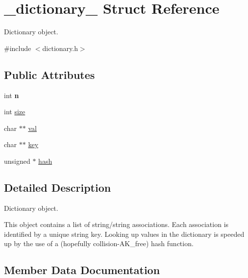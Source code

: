 \hypertarget{struct__dictionary__}{}\section{\+\_\+dictionary\+\_\+ Struct Reference}
\label{struct__dictionary__}


Dictionary object.  




{\ttfamily \#include $<$dictionary.\+h$>$}

\subsection*{Public Attributes}
\begin{DoxyCompactItemize}
\item 
\mbox{\label{struct__dictionary___ac93e659a505b71aa87b8b558b55ee872}} 
int {\bfseries n}
\item 
int \hyperlink{struct__dictionary___a2d90a3894737abd3270d8b9aefaac5ef}{size}
\item 
char $\ast$$\ast$ \hyperlink{struct__dictionary___a7a89c8fb24cb365745431d881f8f0afd}{val}
\item 
char $\ast$$\ast$ \hyperlink{struct__dictionary___a3c962bd7edff49be125396596d1bec75}{key}
\item 
unsigned $\ast$ \hyperlink{struct__dictionary___a017aee3083b2fc453bcf2d7b5b51af86}{hash}
\end{DoxyCompactItemize}


\subsection{Detailed Description}
Dictionary object. 

This object contains a list of string/string associations. Each association is identified by a unique string key. Looking up values in the dictionary is speeded up by the use of a (hopefully collision-\/\+A\+K\+\_\+free) hash function. 

\subsection{Member Data Documentation}
\mbox{\label{struct__dictionary___a017aee3083b2fc453bcf2d7b5b51af86}} 
